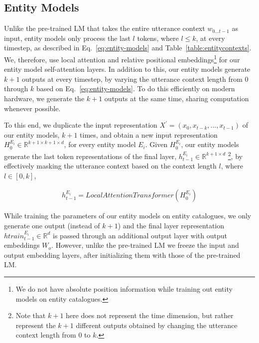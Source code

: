 \documentclass{article}
\begin{document}
\subsection{Entity Models}

Unlike the pre-trained LM that takes the entire utterance context  $w_{0...t-1}$  as input, entity models only process the last $l$ tokens, where $l \leq k$, at every timestep, as described in Eq.~\ref{eq:entity-models} and Table~\ref{table:entitycontexts}. We, therefore, use local attention \cite{pmlr-v80-parmar18a} and relative positional embeddings\footnote{We do not have absolute position information while training out entity models on entity catalogues.} \cite{shaw-etal-2018-self} for our entity model self-attention layers. In addition to this, our entity models generate $k+1$ outputs at every timestep, by varying the utterance context length from $0$ through $k$ based on Eq.~\ref{eq:entity-models}. To do this efficiently on modern hardware, we generate the $k+1$ outputs at the same time, sharing computation whenever possible.

To this end, we duplicate the input representation $X^{'} = (x_0, x_{t-k}, ..., x_{t-1})$ of our entity models, $k+1$ times, and obtain a new input representation $H_0^{E_i} \in \mathbb{R}^{k+1 \times k+1 \times d}$, for every entity model $E_i$. Given $H_0^{E_i}$, our entity models generate the last token representations of the final layer, $h_{t-1}^{E_i} \in \mathbb{R}^{k+1 \times d}$ \footnote{Note that $k+1$ here does not represent the time dimension, but rather represent the $k+1$ different outputs obtained by changing the utterance context length from $0$ to $k$.}, by effectively masking the utterance context based on the context length $l$, where $l \in [0, k]$,

\begin{equation}
	\label{eq:entity-lm}
	\begin{gathered}
		h_{t-1}^{E_i} = LocalAttentionTransformer(H_0^{E_i})
	\end{gathered}
\end{equation}

While training the parameters of our entity models on entity catalogues, we only generate one output (instead of $k+1$) and the final layer representation $htrain_{t-1}^{E_i} \in \mathbb{R}^{d}$ is passed through an additional output layer with output embeddings $W_o$. However, unlike the pre-trained LM we freeze the input and output embedding layers, after initializing them with those of the pre-trained LM.
 
\end{document}
